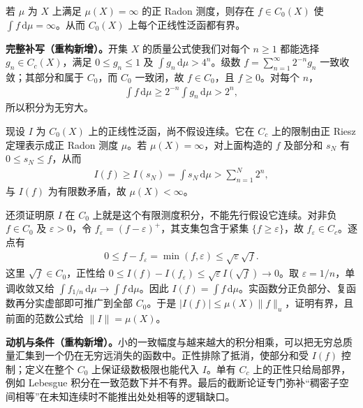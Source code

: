 \documentclass[../../main.tex]{subfiles}
\begin{document}
\begin{exercise}\label{exercise:ch07-positive-czero-automatic-bound}
若 $\mu$ 为 $X$ 上满足 $\mu(X)=\infty$ 的正 Radon 测度，则存在 $f\in C_0(X)$ 使 $\int f\,\mathrm d\mu=\infty$。从而 $C_0(X)$ 上每个正线性泛函都有界。
\end{exercise}
\begin{solution}
\textbf{完整补写（重构新增）。}开集 $X$ 的质量公式使我们对每个 $n\geqslant1$ 都能选择 $g_n\in C_c(X)$，满足 $0\leqslant g_n\leqslant1$ 及 $\int g_n\,\mathrm d\mu>4^n$。级数 $f=\sum_{n=1}^\infty2^{-n}g_n$ 一致收敛；其部分和属于 $C_0$，而 $C_0$ 一致闭，故 $f\in C_0$，且 $f\geqslant0$。对每个 $n$，
\begin{align*}
\int f\,\mathrm d\mu\geqslant2^{-n}\int g_n\,\mathrm d\mu>2^n,
\end{align*}
所以积分为无穷大。

现设 $I$ 为 $C_0(X)$ 上的正线性泛函，尚不假设连续。它在 $C_c$ 上的限制由正 Riesz 定理表示成正 Radon 测度 $\mu$。若 $\mu(X)=\infty$，对上面构造的 $f$ 及部分和 $s_N$ 有 $0\leqslant s_N\leqslant f$，从而
\begin{align*}
I(f)\geqslant I(s_N)=\int s_N\,\mathrm d\mu
>\sum_{n=1}^N2^n,
\end{align*}
与 $I(f)$ 为有限数矛盾，故 $\mu(X)<\infty$。

还须证明原 $I$ 在 $C_0$ 上就是这个有限测度积分，不能先行假设它连续。对非负 $f\in C_0$ 及 $\varepsilon>0$，令 $f_\varepsilon=(f-\varepsilon)^+$，其支集包含于紧集 $\{f\geqslant\varepsilon\}$，故 $f_\varepsilon\in C_c$。逐点有
\begin{align*}
0\leqslant f-f_\varepsilon=\min(f,\varepsilon)
\leqslant\sqrt\varepsilon\sqrt f.
\end{align*}
这里 $\sqrt f\in C_0$，正性给 $0\leqslant I(f)-I(f_\varepsilon)\leqslant\sqrt\varepsilon I(\sqrt f)\to0$。取 $\varepsilon=1/n$，单调收敛又给 $\int f_{1/n}\,\mathrm d\mu\to\int f\,\mathrm d\mu$。因此 $I(f)=\int f\,\mathrm d\mu$。实函数分正负部分、复函数再分实虚部即可推广到全部 $C_0$。于是 $|I(f)|\leqslant\mu(X)\|f\|_u$，证明有界，且前面的范数公式给 $\|I\|=\mu(X)$。
\end{solution}
\begin{remark}
\textbf{动机与条件（重构新增）。}小的一致幅度与越来越大的积分相乘，可以把无穷总质量汇集到一个仍在无穷远消失的函数中。正性排除了抵消，使部分和受 $I(f)$ 控制；定义在整个 $C_0$ 上保证级数极限也能代入 $I$。单有 $C_c$ 上的正性只给局部界，例如 Lebesgue 积分在一致范数下并不有界。最后的截断论证专门弥补“稠密子空间相等”在未知连续时不能推出处处相等的逻辑缺口。
\end{remark}
\end{document}
